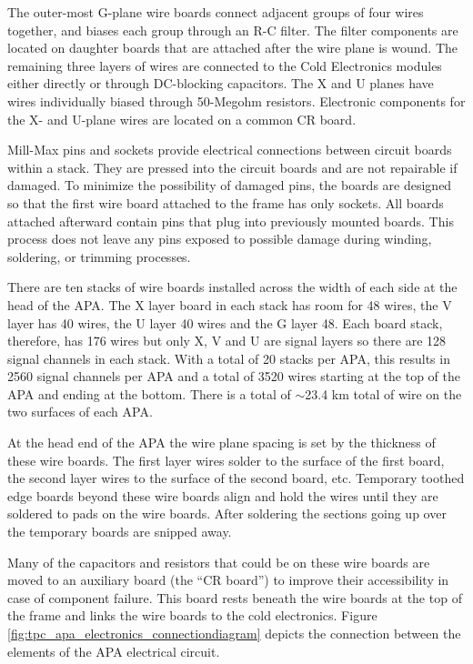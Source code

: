 The outer-most G-plane wire boards connect adjacent groups of four wires together, and biases each group through an R-C filter. The filter components are located on daughter boards that are attached after the wire plane is wound. The remaining three layers of wires are connected to the Cold Electronics modules either directly or through DC-blocking capacitors. The X and U planes have wires individually biased through 50-Megohm resistors. Electronic components for the X- and U-plane wires are located on a common CR board.

Mill-Max pins and sockets provide electrical connections between circuit boards within a stack. They are pressed into the circuit boards and are not repairable if damaged. To minimize the possibility of damaged pins, the boards are designed so that the first wire board attached to the frame has only sockets. All boards attached afterward contain pins that plug into previously mounted boards. This process does not leave any pins exposed to possible damage during winding, soldering, or trimming processes.

There are ten stacks of wire boards installed across the width of each side at the head of the APA.  The X layer board in each stack has room for 48 wires, the V layer has 40 wires, the U layer 40 wires and the G layer 48.  Each board stack, therefore, has 176 wires but only X, V and U are signal layers so there are 128 signal channels in each stack.  With a total of 20 stacks per APA, this results in 2560 signal channels per APA and a total of 3520 wires starting at the top of the APA and ending at the bottom.  There is a total of $\sim$23.4 km total of wire on the two surfaces of each APA.  

At the head end of the APA the wire plane spacing is set by the thickness of these wire boards.  The first layer wires solder to the surface of the first board, the second layer wires to the surface of the second board, etc.  Temporary toothed edge boards beyond these wire boards align and hold the wires until they are soldered to pads on the wire boards.  After soldering the sections going up over the temporary boards are snipped away.

Many of the capacitors and resistors that could be on these wire boards are moved to an auxiliary board (the ``CR board'') to improve their accessibility in case of component failure.  This board rests beneath the wire boards at the top of the frame and links the wire boards to the cold electronics.  Figure \ref{fig:tpc_apa_electronics_connectiondiagram} depicts the connection between the elements of the APA electrical circuit.

